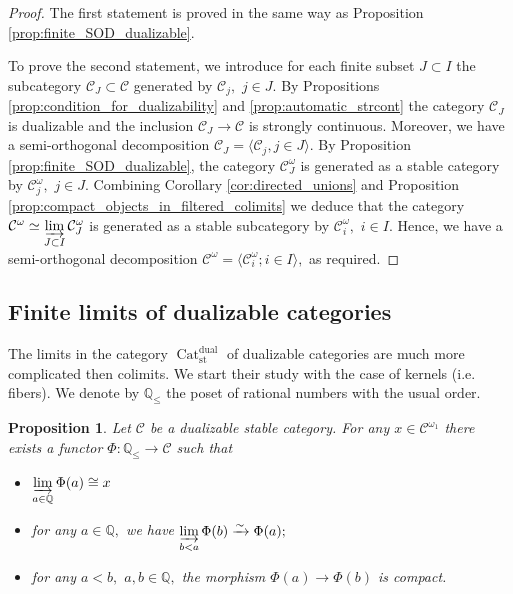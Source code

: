 \documentclass[11pt,leqno]{amsart}
\newtheorem{prop}[theo]{Proposition}
\numberwithin{equation}{section}
\def\Q{\mathbb{Q}}
\newcommand{\indlim}[1][]{\mathop{\varinjlim}\limits_{#1}}
\newcommand{\xto}{\xrightarrow}
\newcommand{\Cat}{\operatorname{Cat}}
\newcommand{\st}{\operatorname{st}}
\newcommand{\dual}{\operatorname{dual}}
\newcommand{\cC}{{\mathcal C}}
\newcommand{\la}{\langle}
\newcommand{\ra}{\rangle}
\begin{document}
\begin{proof}The first statement is proved in the same way as Proposition \ref{prop:finite_SOD_dualizable}.

To prove the second statement, we introduce for each finite subset $J\subset I$ the subcategory $\cC_J\subset\cC$ generated by $\cC_j,$ $j\in J.$ By Propositions \ref{prop:condition_for_dualizability} and \ref{prop:automatic_strcont} the category $\cC_J$ is dualizable and the inclusion $\cC_J\to\cC$ is strongly continuous. Moreover, we have a semi-orthogonal decomposition $\cC_J=\la \cC_j, j\in J\ra.$ By Proposition \ref{prop:finite_SOD_dualizable}, the category $\cC_J^{\omega}$ is generated as a stable category by $\cC_j^{\omega},$ $j\in J.$ Combining Corollary \ref{cor:directed_unions} and Proposition \ref{prop:compact_objects_in_filtered_colimits} we deduce that the category $\cC^{\omega}\simeq\indlim[J\subset I]\cC_J^{\omega}$ is generated as a stable subcategory by $\cC_i^{\omega},$ $i\in I.$ Hence, we have a semi-orthogonal decomposition $\cC^{\omega}=\la \cC_i^{\omega}; i\in I\ra,$ as required.\end{proof}

\subsection{Finite limits of dualizable categories}
\label{ssec:finite_limits_of_dualizable}

The limits in the category $\Cat_{\st}^{\dual}$ of dualizable categories are much more complicated then colimits. We start their study with the case of kernels (i.e. fibers). We denote by $\Q_{\leq}$ the poset of rational numbers with the usual order.

\begin{prop}\label{prop:functors_from_Q} Let $\cC$ be a dualizable stable category. For any $x\in\cC^{\omega_1}$ there exists a functor $\Phi:\Q_{\leq}\to\cC$ such that

\begin{itemize}
\item $\indlim[a\in\Q]\Phi(a)\cong x$

\item for any $a\in\Q,$ we have $\indlim[b<a]\Phi(b)\xto{\sim}\Phi(a);$

\item for any $a<b,$ $a,b\in\Q,$ the morphism $\Phi(a)\to\Phi(b)$ is compact.
\end{itemize}
\end{prop}
\end{document}
